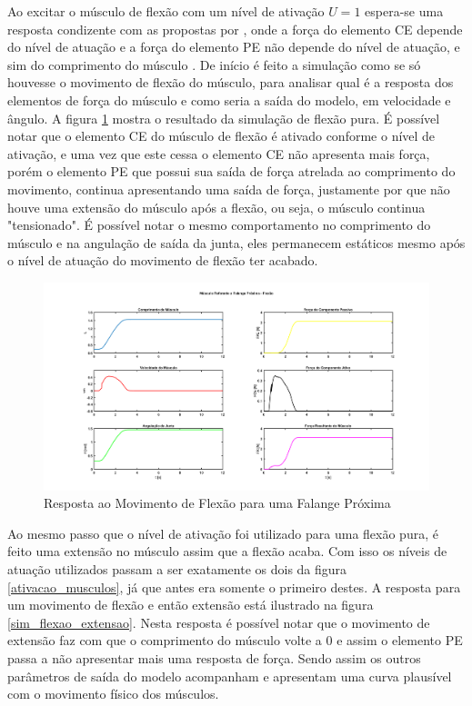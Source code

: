 Ao excitar o músculo de flexão com um nível de ativação $U=1$ espera-se uma resposta condizente com as propostas por \cite{rosen1999performances}, onde a força do elemento CE depende do nível de atuação e a força do elemento PE não depende do nível de atuação, e sim do comprimento do músculo \cite{zajac1989muscle}. De início é feito a simulação como se só houvesse o movimento de flexão do músculo, para analisar qual é a resposta dos elementos de força do músculo e como seria a saída do modelo, em velocidade e ângulo. A figura \ref{sim_flexao} mostra o resultado da simulação de flexão pura. É possível notar que o elemento CE do músculo de flexão é ativado conforme o nível de ativação, e uma vez que este cessa o elemento CE não apresenta mais força, porém o elemento PE que possui sua saída de força atrelada ao comprimento do movimento, continua apresentando uma saída de força, justamente por que não houve uma extensão do músculo após a flexão, ou seja, o músculo continua "tensionado". É possível notar o mesmo comportamento no comprimento do músculo e na angulação de saída da junta, eles permanecem estáticos mesmo após o nível de atuação do movimento de flexão ter acabado.

\begin{figure}[H]
\centering
\includegraphics[width = 1\textwidth]{img/flexao.png}
\caption[Resposta ao Movimento de Flexão para uma Falange Próxima]{Resposta ao Movimento de Flexão para uma Falange Próxima}
\label{sim_flexao}
\end{figure}

Ao mesmo passo que o nível de ativação foi utilizado para uma flexão pura, é feito uma extensão no músculo assim que a flexão acaba. Com isso os níveis de atuação utilizados passam a ser exatamente os dois da figura \ref{ativacao_musculos}, já que antes era somente o primeiro destes. A resposta para um movimento de flexão e então extensão está ilustrado na figura \ref{sim_flexao_extensao}. Nesta resposta é possível notar que o movimento de extensão faz com que o comprimento do músculo volte a 0 e assim o elemento PE passa a não apresentar mais uma resposta de força. Sendo assim os outros parâmetros de saída do modelo acompanham e apresentam uma curva plausível com o movimento físico dos músculos.

